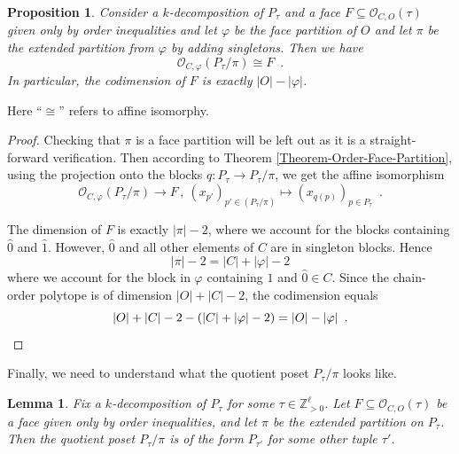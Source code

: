 \documentclass[12pt,a4paper]{amsart}
\newtheorem{lemma}[theorem]{Lemma}
\newtheorem{proposition}[theorem]{Proposition}
\theoremstyle{definition}
\newcommand{\OP}{\mathcal{O}}
\newcommand{\Z}{\mathbb{Z}}
\newcommand{\Ptau}{P_\tau}
\begin{document}
\begin{proposition}\label{prop-normal-form-order}
Consider a $k$-decomposition of $\Ptau$ and a face $F\subseteq\OP_{C,O}(\tau)$ given only by order inequalities and let $\varphi$ be the face partition of $O$ and let $\pi$ be the extended partition from $\varphi$ by adding singletons.
Then we have
\begin{equation*}
    \OP_{C,\varphi}(P_\tau/\pi)\cong F \enspace .
\end{equation*}
In particular, the codimension of $F$ is exactly $|O|-|\varphi|$.
\end{proposition}
Here \enquote{$\cong$} refers to affine isomorphy.
\begin{proof}
Checking that $\pi$ is a face partition will be left out as it is a straight-forward verification.
Then according to Theorem \ref{Theorem-Order-Face-Partition}, using the projection onto the blocks $q:P_\tau\rightarrow P_\tau/\pi$, we get the affine isomorphism
\[
   \OP_{C,\varphi}(P_\tau/\pi)\rightarrow F \,,\ (x_{p'})_{p'\in (\Ptau/\pi)}\mapsto (x_{q(p)})_{p\in \Ptau} \enspace .
\]

The dimension of $F$ is exactly $|\pi|-2$, where we account for the blocks containing $\hat{0}$ and $\hat{1}$.
% 
However, $\hat{0}$ and all other elements of $C$ are in singleton blocks.
Hence
% 
\begin{equation*}
    |\pi|-2=|C|+|\varphi|-2
\end{equation*}
% 
where we account for the block in $\varphi$ containing $\hat{1}$ and $\hat{0}\in C$.
Since the chain-order polytope is of dimension $|O|+|C|-2$, the codimension equals
\begin{equation*}
    |O|+|C|-2-(|C|+|\varphi|-2)=|O|-|\varphi| \enspace . \qedhere
\end{equation*}
\end{proof}
Finally, we need to understand what the quotient poset $\Ptau/\pi$ looks like.
\begin{lemma}\label{Lemma-Quotient-Tuple}
    Fix a $k$-decomposition of $\Ptau$ for some $\tau\in\Z_{> 0}^\ell$. Let $F\subseteq\OP_{C,O}(\tau)$ be a face given only by order inequalities, and let $\pi$ be the extended partition on $\Ptau$.
    Then the quotient poset $\Ptau/\pi$ is of the form $P_{\tau'}$ for some other tuple $\tau'$.
\end{lemma}
\end{document}
